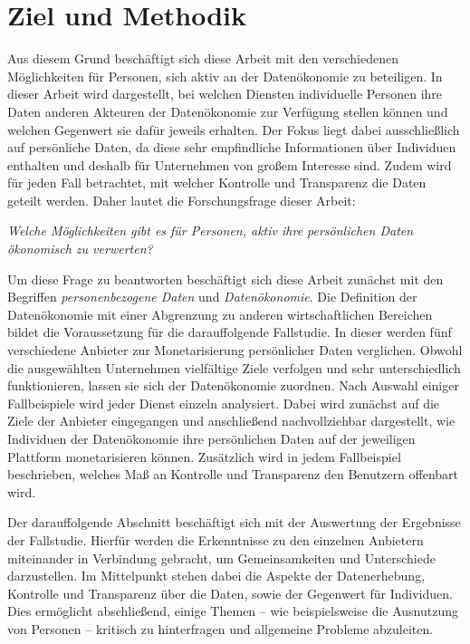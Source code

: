 \section{Ziel und Methodik}
Aus diesem Grund beschäftigt sich diese Arbeit mit den verschiedenen Möglichkeiten für Personen, sich aktiv an der Datenökonomie zu beteiligen. In dieser Arbeit wird dargestellt, bei welchen Diensten individuelle Personen ihre Daten anderen Akteuren der Datenökonomie zur Verfügung stellen können und welchen Gegenwert sie dafür jeweils erhalten. Der Fokus liegt dabei ausschließlich auf persönliche Daten, da diese sehr empfindliche Informationen über Individuen enthalten und deshalb für Unternehmen von großem Interesse sind. Zudem wird für jeden Fall betrachtet, mit welcher Kontrolle und Transparenz die Daten geteilt werden. Daher lautet die Forschungsfrage dieser Arbeit:

\begin{center}
\textit{Welche Möglichkeiten gibt es für Personen, aktiv ihre persönlichen Daten ökonomisch zu verwerten?}
\end{center}

\noindent Um diese Frage zu beantworten beschäftigt sich diese Arbeit zunächst mit den Begriffen \textit{personenbezogene Daten} und \textit{Datenökonomie}. Die Definition der Datenökonomie mit einer Abgrenzung zu anderen wirtschaftlichen Bereichen bildet die Voraussetzung für die darauffolgende Fallstudie. In dieser werden fünf verschiedene Anbieter zur Monetarisierung persönlicher Daten verglichen. Obwohl die ausgewählten Unternehmen vielfältige Ziele verfolgen und sehr unterschiedlich funktionieren, lassen sie sich der Datenökonomie zuordnen. Nach Auswahl einiger Fallbeispiele wird jeder Dienst einzeln analysiert. Dabei wird zunächst auf die Ziele der Anbieter eingegangen und anschließend nachvollziehbar dargestellt, wie Individuen der Datenökonomie ihre persönlichen Daten auf der jeweiligen Plattform monetarisieren können. Zusätzlich wird in jedem Fallbeispiel beschrieben, welches Maß an Kontrolle und Transparenz den Benutzern offenbart wird. \newline

\noindent Der darauffolgende Abschnitt beschäftigt sich mit der Auswertung der Ergebnisse der Fallstudie. Hierfür werden die Erkenntnisse zu den einzelnen Anbietern miteinander in Verbindung gebracht, um Gemeinsamkeiten und Unterschiede darzustellen. Im Mittelpunkt stehen dabei die Aspekte der Datenerhebung, Kontrolle und Transparenz über die Daten, sowie der Gegenwert für Individuen. Dies ermöglicht abschließend, einige Themen -- wie beispielsweise die Ausnutzung von Personen -- kritisch zu hinterfragen und allgemeine Probleme abzuleiten.
